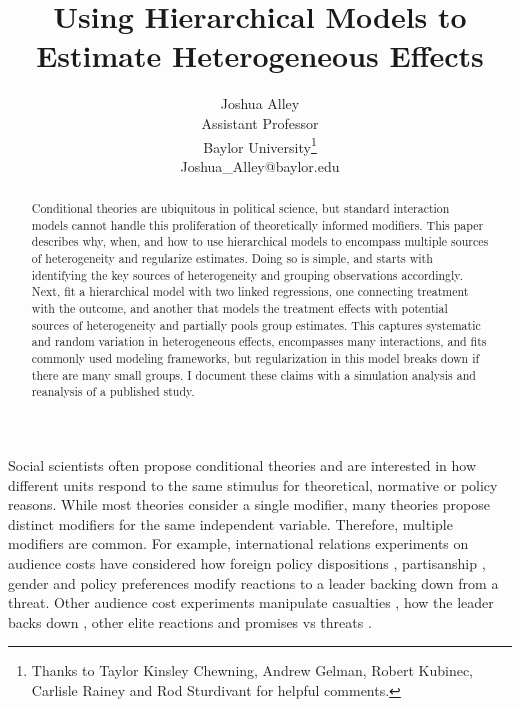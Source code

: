 \documentclass[12pt]{article}
\title{\textbf{Using Hierarchical Models to Estimate Heterogeneous Effects}}
\author{Joshua Alley \\
Assistant Professor \\
Baylor University\thanks{Thanks to Taylor Kinsley Chewning, Andrew Gelman, Robert Kubinec, Carlisle Rainey and Rod Sturdivant for helpful comments.} \\
Joshua\_Alley@baylor.edu
}
\date{}
\begin{document}
\maketitle 

\begin{abstract} 
Conditional theories are ubiquitous in political science, but standard interaction models cannot handle this proliferation of theoretically informed modifiers.
This paper describes why, when, and how to use hierarchical models to encompass multiple sources of heterogeneity and regularize estimates.
Doing so is simple, and starts with identifying the key sources of heterogeneity and grouping observations accordingly. 
Next, fit a hierarchical model with two linked regressions, one connecting treatment with the outcome, and another that models the treatment effects with potential sources of heterogeneity and partially pools group estimates.
This captures systematic and random variation in heterogeneous effects, encompasses many interactions, and fits commonly used modeling frameworks, but regularization in this model breaks down if there are many small groups.
I document these claims with a simulation analysis and reanalysis of a published study. 
\end{abstract} 


\newpage 
\doublespace 



Social scientists often propose conditional theories \citep{ClarkGolder2023} and are interested in how different units respond to the same stimulus for theoretical, normative or policy reasons.
While most theories consider a single modifier, many theories propose distinct modifiers for the same independent variable.
Therefore, multiple modifiers are common. 
For example, international relations experiments on audience costs \citep{Tomz2007ar} have considered how foreign policy dispositions \citep{KertzerBrutger2016}, partisanship \citep{LevenduskyHorowitz2012}, gender \citep{Barnhartetal2020, SchwartzBlair2020} and policy preferences \citep{Chaudoin2014} modify reactions to a leader backing down from a threat.
Other audience cost experiments manipulate casualties \citep{DaviesJohns2013}, how the leader backs down \citep{LinGreenberg2019}, other elite reactions \citep{LevenduskyHorowitz2012} and promises vs threats \citep{Levyetal2015}.
\end{document}
